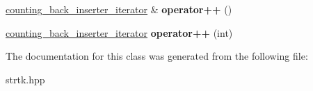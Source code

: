 \begin{DoxyCompactItemize}
\item 
\hypertarget{classstrtk_1_1counting__back__inserter__iterator_a2d7b29c8db98c897ab696805b7a3d107}{\hyperlink{classstrtk_1_1counting__back__inserter__iterator}{counting\-\_\-back\-\_\-inserter\-\_\-iterator} \& {\bfseries operator++} ()}\label{classstrtk_1_1counting__back__inserter__iterator_a2d7b29c8db98c897ab696805b7a3d107}

\item 
\hypertarget{classstrtk_1_1counting__back__inserter__iterator_a2428a4e887900465aea1d5c63c7b55d3}{\hyperlink{classstrtk_1_1counting__back__inserter__iterator}{counting\-\_\-back\-\_\-inserter\-\_\-iterator} {\bfseries operator++} (int)}\label{classstrtk_1_1counting__back__inserter__iterator_a2428a4e887900465aea1d5c63c7b55d3}

\end{DoxyCompactItemize}


The documentation for this class was generated from the following file\-:\begin{DoxyCompactItemize}
\item 
strtk.\-hpp\end{DoxyCompactItemize}
